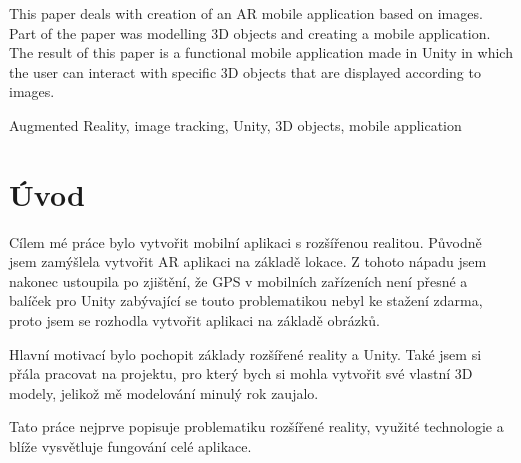 \documentclass[12pt, a4paper,
twoside,        %
openright
]{report}
\begin{document}
	\vspace{18pt}

	
This paper deals with creation of an AR mobile application based on images. Part of the paper was modelling 3D objects and creating a mobile application.  The result of this paper is a functional mobile application made in Unity in which the user can interact with specific 3D objects that are displayed according to images. 
	
	\vspace{18pt}
	
	
	\noindent Augmented Reality, image tracking, Unity, 3D objects, mobile application
	
	\clearpage %

	
	\tableofcontents %

	\setcounter{page}{1} %

	\chapter*{Úvod}
Cílem mé práce bylo vytvořit mobilní aplikaci s rozšířenou realitou.  Původně jsem zamýšlela vytvořit AR aplikaci na základě lokace.  Z tohoto nápadu jsem nakonec ustoupila po zjištění, že GPS v mobilních zařízeních není přesné a balíček pro Unity zabývající se touto problematikou nebyl ke stažení zdarma, proto jsem se rozhodla vytvořit aplikaci na základě obrázků.
 
Hlavní motivací bylo pochopit základy rozšířené reality a Unity. Také jsem si přála pracovat na projektu, pro který bych si mohla vytvořit své vlastní 3D modely, jelikož mě modelování minulý rok zaujalo.  

Tato práce nejprve popisuje problematiku rozšířené reality, využité technologie a blíže vysvětluje fungování celé aplikace. 




 
\end{document}
